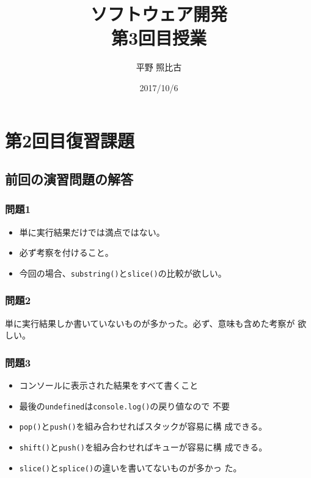 %

\title{ソフトウェア開発\\第3回目授業}
\author{平野 照比古}
\institute{}
\date{2017/10/6}

\frame{\maketitle}
\section{第2回目復習課題}
\subsection{前回の演習問題の解答}
  \begin{frame}[containsverbatim]
   \frametitle{問題1}
   \begin{itemize}
    \item 単に実行結果だけでは満点ではない。
    \item 必ず考察を付けること。
    \item 今回の場合、\texttt{substring()}と\texttt{slice()}の比較が欲しい。
   \end{itemize}
  \end{frame}
  \begin{frame}[containsverbatim]
   \frametitle{問題2}

   単に実行結果しか書いていないものが多かった。必ず、意味も含めた考察が
   欲しい。
  \end{frame}
  \begin{frame}[containsverbatim]
   \frametitle{問題3}
   \begin{itemize}
    \item コンソールに表示された結果をすべて書くこと
    \item 最後の\texttt{undefined}は\texttt{console.log()}の戻り値なので
          不要
    \item \texttt{pop()}と\texttt{push()}を組み合わせればスタックが容易に構
          成できる。
    \item \texttt{shift()}と\texttt{push()}を組み合わせればキューが容易に構
          成できる。
    \item \texttt{slice()}と\texttt{splice()}の違いを書いてないものが多かっ
          た。
   \end{itemize}
  \end{frame}
